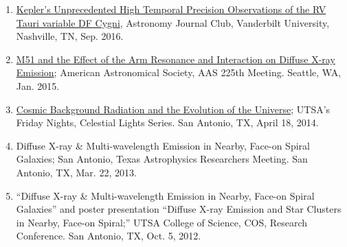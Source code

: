 \documentclass[letter,11pt]{article}
\begin{document}
\begin{enumerate}[\bfseries 1.]
\item \href{https://as.vanderbilt.edu/astronomy/2016/08/journal-club-fall-2016/}{Kepler's Unprecedented High Temporal Precision Observations of the RV Tauri variable DF Cygni}, Astronomy Journal Club, Vanderbilt University, Nashville, TN, Sep. 2016.

\item \href{http://adsabs.harvard.edu/abs/2015AAS...22522708V}{M51 and the Effect of the Arm Resonance and Interaction on Diffuse X-ray Emission}; American Astronomical Society, AAS 225th Meeting. Seattle, WA, Jan. 2015.

\item \href{http://www.utsa.edu/today/2014/04/celestiallights4.html}{Cosmic Background Radiation and the Evolution of the Universe}; UTSA’s Friday Nights, Celestial Lights Series. San Antonio, TX, April 18, 2014.

\item Diffuse X-ray \& Multi-wavelength Emission in Nearby, Face-on Spiral Galaxies; San Antonio, Texas Astrophysics Researchers Meeting. San Antonio, TX, Mar. 22, 2013.

\item “Diffuse X-ray \& Multi-wavelength Emission in Nearby, Face-on Spiral Galaxies” and poster presentation “Diffuse X-ray Emission and Star Clusters in Nearby, Face-on Spiral;” UTSA College of Science, COS, Research Conference. San Antonio, TX, Oct. 5, 2012.

\end{enumerate}

\end{document}
